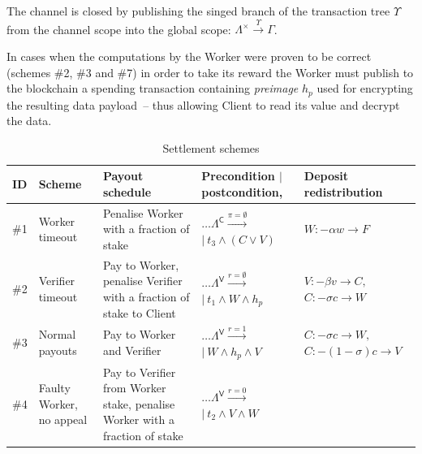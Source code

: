 \documentclass[a4paper]{article}
\begin{document}
The channel is closed by publishing the singed branch of the transaction tree $\Upsilon$ from the channel scope into the global scope: $\Lambda^{\times} \xrightarrow{\Upsilon} \Gamma$.

In cases when the computations by the Worker were proven to be correct (schemes \#2, \#3 and \#7) in order to take its reward the Worker must publish to the blockchain a spending transaction containing \textit{preimage} $h_p$ used for encrypting the resulting data payload~-- thus allowing Client to read its value and decrypt the data.

\begin{table}[h!]
    \caption{Settlement schemes}
    \label{table:settlement}
    \begin{adjustbox}{center}
        \begin{tabular}{@{} l m{2.5cm} m{5cm} m{3cm} l @{}}
            \toprule
            ID & Scheme & Payout schedule & \makecell[l]{Precondition\\ $\mid$ postcondition\footnotemark[1],\footnotemark[2]} & Deposit redistribution\footnotemark[1] \\
            \midrule
            \#1 & Worker timeout & Penalise Worker with a fraction of stake 
            & \makecell[l]{$\ldots \Lambda^\mathsf{C} \xrightarrow{\pi=\emptyset}$\\ $\mid\: t_3 \wedge (C \vee V)$ }
            & $W: -\alpha w \rightarrow F$ \\
            \midrule
            \#2 & Verifier timeout & Pay to Worker, penalise Verifier with a fraction of stake to Client 
            & \makecell[l]{$\ldots \Lambda^\mathsf{V} \xrightarrow{r=\emptyset}$\\ $\mid\: t_1 \wedge W \wedge h_p$ }
            & \makecell[l]{$V: -\beta v \rightarrow C,$\\$C: -\sigma c \rightarrow W$} \\
            \midrule
            \#3 & Normal payouts & Pay to Worker and Verifier 
            & \makecell[l]{$\ldots \Lambda^\mathsf{V} \xrightarrow{r=1}$\\ $\mid\: W \wedge h_p \wedge V$ }
            & \makecell[l]{$C: -\sigma c \rightarrow W,$\\$C: -(1-\sigma) c \rightarrow V$} \\
            \midrule
            \#4 & Faulty Worker, no appeal & Pay to Verifier from Worker stake, penalise Worker with a fraction of stake 
            & \makecell[l]{$\ldots \Lambda^\mathsf{V} \xrightarrow{r=0}$\\ $\mid\: t_2 \wedge V \wedge W$ }

\end{tabular}
\end{adjustbox}
\end{table}
\end{document}
